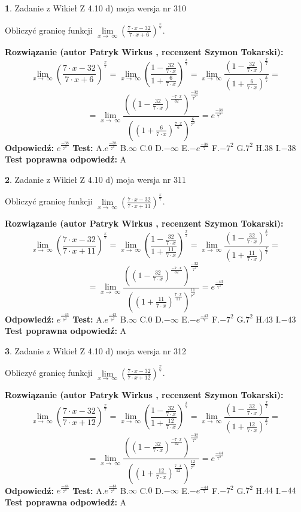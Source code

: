 \documentclass[12pt, a4paper]{article}
\theoremstyle{definition} %
\newtheorem{zad}{}
\newcommand{\zadStart}[1]{\begin{zad}#1\newline}
\newcommand{\zadStop}{\end{zad}}
\newcommand{\rozwStart}[2]{\noindent \textbf{Rozwiązanie (autor #1 , recenzent #2): }\newline}
\newcommand{\rozwStop}{\newline}
\newcommand{\odpStart}{\noindent \textbf{Odpowiedź:}\newline}
\newcommand{\odpStop}{\newline}
\newcommand{\testStart}{\noindent \textbf{Test:}\newline}
\newcommand{\testStop}{\newline}
\newcommand{\kluczStart}{\noindent \textbf{Test poprawna odpowiedź:}\newline}
\newcommand{\kluczStop}{\newline}
\begin{document}
\zadStart{Zadanie z Wikieł Z 4.10 d) moja wersja nr 310}


Obliczyć granicę funkcji  $\lim\limits_{x\to\ \infty}(\frac{7\cdot x-32}{7\cdot x+6})^{\frac{x}{7}}$.
\zadStop
\rozwStart{Patryk Wirkus}{Szymon Tokarski}
$$\lim\limits_{x\to\ \infty}(\frac{7\cdot x-32}{7\cdot x+6})^{\frac{x}{7}} = \lim\limits_{x\to\ \infty}(\frac{1-\frac{32}{7\cdot x}}{1+\frac{6}{7\cdot x}})^{\frac{x}{7}}=\lim\limits_{x\to\ \infty}\frac{(1-\frac{32}{7\cdot x})^{\frac{x}{7}}}{(1+\frac{6}{7\cdot x})^{\frac{x}{7}}}=$$
$$=\lim\limits_{x\to\ \infty}\frac{((1-\frac{32}{7\cdot x})^{\frac{-7\cdot x}{32}})^{\frac{-32}{7^{2}}}}{((1+\frac{6}{7\cdot x})^{\frac{7\cdot x}{6}})^{\frac{6}{7^{2}}}}=e^{\frac{-38}{7^{2}}}$$
\rozwStop
\odpStart
$e^{\frac{-38}{7^{2}}}$
\odpStop
\testStart
A.$e^{\frac{-38}{7^{2}}}$ B.$\infty$ C.$0$ D.$-\infty$ E.$-e^{\frac{-38}{7}}$
F.$-7^{2}$ G.$7^{2}$
H.$38$
I.$-38$
\testStop
\kluczStart
A
\kluczStop



\zadStart{Zadanie z Wikieł Z 4.10 d) moja wersja nr 311}


Obliczyć granicę funkcji  $\lim\limits_{x\to\ \infty}(\frac{7\cdot x-32}{7\cdot x+11})^{\frac{x}{7}}$.
\zadStop
\rozwStart{Patryk Wirkus}{Szymon Tokarski}
$$\lim\limits_{x\to\ \infty}(\frac{7\cdot x-32}{7\cdot x+11})^{\frac{x}{7}} = \lim\limits_{x\to\ \infty}(\frac{1-\frac{32}{7\cdot x}}{1+\frac{11}{7\cdot x}})^{\frac{x}{7}}=\lim\limits_{x\to\ \infty}\frac{(1-\frac{32}{7\cdot x})^{\frac{x}{7}}}{(1+\frac{11}{7\cdot x})^{\frac{x}{7}}}=$$
$$=\lim\limits_{x\to\ \infty}\frac{((1-\frac{32}{7\cdot x})^{\frac{-7\cdot x}{32}})^{\frac{-32}{7^{2}}}}{((1+\frac{11}{7\cdot x})^{\frac{7\cdot x}{11}})^{\frac{11}{7^{2}}}}=e^{\frac{-43}{7^{2}}}$$
\rozwStop
\odpStart
$e^{\frac{-43}{7^{2}}}$
\odpStop
\testStart
A.$e^{\frac{-43}{7^{2}}}$ B.$\infty$ C.$0$ D.$-\infty$ E.$-e^{\frac{-43}{7}}$
F.$-7^{2}$ G.$7^{2}$
H.$43$
I.$-43$
\testStop
\kluczStart
A
\kluczStop



\zadStart{Zadanie z Wikieł Z 4.10 d) moja wersja nr 312}


Obliczyć granicę funkcji  $\lim\limits_{x\to\ \infty}(\frac{7\cdot x-32}{7\cdot x+12})^{\frac{x}{7}}$.
\zadStop
\rozwStart{Patryk Wirkus}{Szymon Tokarski}
$$\lim\limits_{x\to\ \infty}(\frac{7\cdot x-32}{7\cdot x+12})^{\frac{x}{7}} = \lim\limits_{x\to\ \infty}(\frac{1-\frac{32}{7\cdot x}}{1+\frac{12}{7\cdot x}})^{\frac{x}{7}}=\lim\limits_{x\to\ \infty}\frac{(1-\frac{32}{7\cdot x})^{\frac{x}{7}}}{(1+\frac{12}{7\cdot x})^{\frac{x}{7}}}=$$
$$=\lim\limits_{x\to\ \infty}\frac{((1-\frac{32}{7\cdot x})^{\frac{-7\cdot x}{32}})^{\frac{-32}{7^{2}}}}{((1+\frac{12}{7\cdot x})^{\frac{7\cdot x}{12}})^{\frac{12}{7^{2}}}}=e^{\frac{-44}{7^{2}}}$$
\rozwStop
\odpStart
$e^{\frac{-44}{7^{2}}}$
\odpStop
\testStart
A.$e^{\frac{-44}{7^{2}}}$ B.$\infty$ C.$0$ D.$-\infty$ E.$-e^{\frac{-44}{7}}$
F.$-7^{2}$ G.$7^{2}$
H.$44$
I.$-44$
\testStop
\kluczStart
A
\kluczStop
\end{document}
